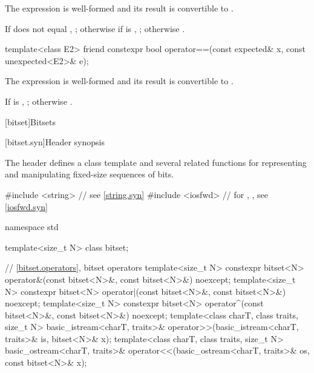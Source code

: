 \begin{itemdescr}
\pnum
\constraints
The expression  is well-formed and
its result is convertible to .

\pnum
\returns
If  does not equal , ;
otherwise if  is , ;
otherwise .
\end{itemdescr}

%
\begin{itemdecl}
template<class E2>
  friend constexpr bool operator==(const expected& x, const unexpected<E2>& e);
\end{itemdecl}

\begin{itemdescr}
\pnum
\constraints
The expression  is well-formed and
its result is convertible to .

\pnum
\returns
If  is ,
;
otherwise .
\end{itemdescr}

[bitset]{Bitsets}
%

[bitset.syn]{Header  synopsis}%

\pnum
The header  defines a class template
and several related functions for representing
and manipulating fixed-size sequences of bits.

\begin{codeblock}
#include <string>   // see \ref{string.syn}
#include <iosfwd>   // for , , see \ref{iosfwd.syn}

namespace std {
  template<size_t N> class bitset;

  // \ref{bitset.operators}, bitset operators
  template<size_t N>
    constexpr bitset<N> operator&(const bitset<N>&, const bitset<N>&) noexcept;
  template<size_t N>
    constexpr bitset<N> operator|(const bitset<N>&, const bitset<N>&) noexcept;
  template<size_t N>
    constexpr bitset<N> operator^(const bitset<N>&, const bitset<N>&) noexcept;
  template<class charT, class traits, size_t N>
    basic_istream<charT, traits>&
      operator>>(basic_istream<charT, traits>& is, bitset<N>& x);
  template<class charT, class traits, size_t N>
    basic_ostream<charT, traits>&
      operator<<(basic_ostream<charT, traits>& os, const bitset<N>& x);
}
\end{codeblock}

